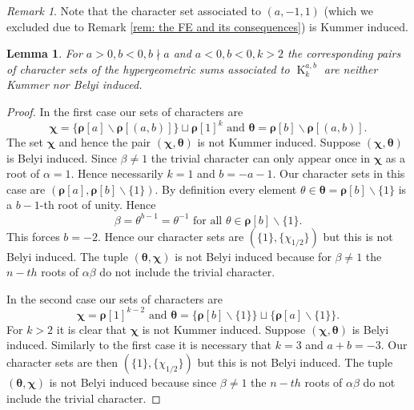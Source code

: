 \documentclass[12pt]{amsart}
\theoremstyle{plain}
\newtheorem{lem}[thm]{Lemma}
\theoremstyle{definition}
\theoremstyle{remark}
\newtheorem{rem}[thm]{Remark}
\numberwithin{equation}{section}
\DeclareMathOperator{\K}{K} %
\begin{document}
\begin{rem}
    Note that the character set associated to $(a,-1,1)$ (which we excluded due to Remark \ref{rem: the FE and its consequences}) is Kummer induced. 
\end{rem}




\begin{lem}\label{l: Not Kummer or belyi}
 For $a>0,b<0, b\nmid a$ and $a<0,b<0,k>2$ the corresponding pairs of character sets of the hypergeometric sums associated to $\K_k^{a,b}$ are neither Kummer nor Belyi induced.
\end{lem}


\begin{proof}
    In the first case our sets of characters are 
    $$\bm\chi=\{\bm \rho[a]\smallsetminus\bm \rho[(a,b)]\}\sqcup\bm \rho[1]^{k} \text{ and }\bm \theta=\bm \rho[b]\smallsetminus\bm \rho[(a,b)].$$
    The set $\bm \chi$ and hence the pair $(\bm \chi,\bm \theta)$ is not Kummer induced. 
    Suppose $(\bm \chi,\bm \theta)$ is Belyi induced. Since $\beta\neq 1$ the trivial character can only appear once in $\bm \chi$ as a root of $\alpha=1$. Hence necessarily $k=1$ and $b=-a-1$. Our character sets in this case are $(\bm \rho[a],\bm \rho[b]\smallsetminus\{1\})$. By definition every element $\theta\in \bm \theta =\bm \rho[b]\smallsetminus\{1\}$ is a $b-1$-th root of unity. Hence 
    $$\beta= \theta^{b-1}=\theta^{-1} \text{ for all }\theta \in \bm \rho[b]\smallsetminus \{1\}.$$
This forces $b=-2$. Hence our character sets are $(\{1\},\{\chi_{1/2}\})$ but this is not Belyi induced. The tuple $(\bm\theta,\bm\chi)$ is not Belyi induced because for $\beta\neq 1$ the $n-th$ roots of $\alpha\beta$ do not include the trivial character. 
    
    In the second case our sets of characters are 
    $$\bm\chi=\bm \rho[1]^{k-2} \text{ and }\bm \theta=\{\bm \rho[b]\smallsetminus\{1\}\}\sqcup\{\bm \rho[a]\smallsetminus\{1\}\}.$$ For $k>2$ it is clear that $\bm \chi$ is not Kummer induced. Suppose $(\bm \chi,\bm \theta)$ is Belyi induced. Similarly to the first case it is necessary that $k=3$ and $a+b=-3$. Our character sets are then $(\{1\},\{\chi_{1/2}\})$ but this is not Belyi induced.  
    The tuple $(\bm\theta,\bm\chi)$ is not Belyi induced because since $\beta\neq 1$ the $n-th$ roots of $\alpha\beta$ do not include the trivial character.
\end{proof}
\end{document}
